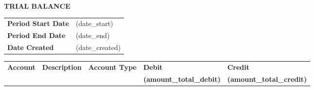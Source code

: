 \documentclass[english]{article}
\providecommand{\tabularnewline}{\\}
\newcommand{\lyxdot}{.}
\begin{document}


\noindent \textbf{TRIAL BALANCE}

\noindent \vspace{10mm}


\noindent \begin{tabular}{ll}
\textbf{Period Start Date} & (date\_start) \tabularnewline
\textbf{Period End Date} & (date\_end) \tabularnewline
\textbf{Date Created} & (date\_created) \tabularnewline
\end{tabular}

\noindent \vspace{10mm}

\noindent \begin{tabular}{>{\raggedright}p{}>{\raggedright}p{}>{\raggedright}p{}>{\raggedright}p{}>{\raggedright}p{}}
\cline{1-5} 
\textbf{Account} & \textbf{Description} & \textbf{Account Type} & \textbf{Debit} & \textbf{Credit}\tabularnewline
\cline{1-5} 
\cline{1-5} 
 & & & \textbf{(amount\_total\_debit)} & \textbf{(amount\_total\_credit)}\tabularnewline
\cline{1-5} 
\end{tabular}

\noindent \vspace{5mm}
\end{document}

